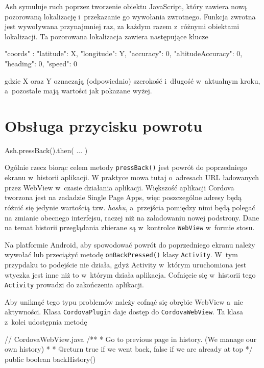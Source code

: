 \documentclass[brudnopis]{xmgr}
\begin{document}
Ash symuluje ruch poprzez tworzenie obiektu JavaScript, który zawiera nową pozorowaną lokalizację i~przekazanie go wywołania zwrotnego. Funkcja zwrotna jest wywoływana przynajmniej raz, za każdym razem z~różnymi obiektami lokalizacji. Ta pozorowana lokalizacja zawiera następujące klucze

\begin{javascriptcode}

{
  "coords" :  {
      "latitude": X, 
      "longitude": Y,
      "accuracy": 0, 
      "altitudeAccuracy": 0, 
      "heading": 0, 
      "speed": 0
   }
}

\end{javascriptcode}

gdzie X oraz Y oznaczają (odpowiednio) szerokość i~długość w~aktualnym kroku, a~pozostałe mają wartości jak pokazane wyżej.   

\section{Obsługa przycisku powrotu}

\begin{javascriptcode}
   Ash.pressBack().then( ... ) 
\end{javascriptcode}

Ogólnie rzecz biorąc celem metody \texttt{pressBack()} jest powrót do poprzedniego ekranu w~historii aplikacji. W praktyce mowa tutaj o~adresach URL ładowanych przez WebView w~czasie działania aplikacji. Większość aplikacji Cordova tworzona jest na zadadzie Single Page Apps, więc poszczególne adresy będą różnić się jedynie wartością tzw. \textit{hashu}, a~przejścia pomiędzy nimi będą polegać na zmianie obecnego interfejsu, raczej niż na załadowaniu nowej podstrony. Dane na temat historii przeglądania zbierane są w~kontrolce \texttt{WebView} w~formie stosu.

Na platformie Android, aby spowodować powrót do poprzedniego ekranu należy wywołać lub przeciążyć metodę \texttt{onBackPressed()} klasy \texttt{Activity}. W~tym przypdaku to podejście nie działa, gdyż Activity w~którym uruchomiona jest wtyczka jest inne niż to w~którym działa aplikacja. Cofnięcie się w~historii tego \texttt{Activity} prowadzi do zakończenia aplikacji. 

Aby uniknąć tego typu problemów należy cofnąć się obrębie WebView a~nie aktywności. Klasa \texttt{CordovaPlugin} daje dostęp do \texttt{CordovaWebView}. Ta klasa z~kolei udostępnia metodę 

\begin{javacode}
    // CordovaWebView.java
    /**
     * Go to previous page in history.  (We manage our own history)
     *
     * @return true if we went back, false if we are already at top
     */
    public boolean backHistory()
\end{javacode}
\end{document}

